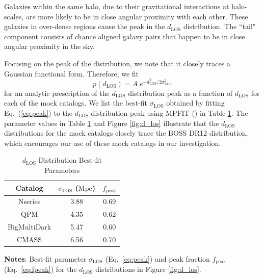 Galaxies within the same halo, due to their gravitational interactions at halo-scales, 
are more likely to be in close angular proximity with each other. These galaxies in 
over-dense regions cause the peak in the $d_{\mathrm{LOS}}$ distribution. The ``tail" 
component consists of chance aligned galaxy pairs that happen to be in close angular 
proximity in the sky. 

Focusing on the peak of the distribution, we note that it closely traces 
a Gaussian functional form. Therefore, we fit
\begin{equation} \label{eq:peak} 
p(d_{\mathrm{LOS}}) = A \; e^{-{d_{\mathrm{LOS}}^2}/{2\sigma_\mathrm{LOS}^2}}
\end{equation}
for an analytic prescription of the $d_{\mathrm{LOS}}$ distribution peak as a 
function of $d_\mathrm{LOS}$ for each of the mock catalogs. We list the 
best-fit $\sigma_\mathrm{LOS}$ obtained by fitting Eq.~(\ref{eq:peak}) to the 
$d_{\mathrm{LOS}}$ distribution peak using 
MPFIT (\citealt{Markwardt:2009aa}) in Table \ref{tab:mpfit}. The parameter values
in Table \ref{tab:mpfit} and Figure \ref{fig:d_los} illustrate that the 
$d_{\mathrm{LOS}}$ distributions for the mock catalogs closely trace 
the BOSS DR12 distribution, which encourages our use of these mock 
catalogs in our investigation.  
\begin{table} 
\caption{$d_{\mathrm{LOS}}$ Distribution Best-fit Parameters} \label{tab:mpfit}
\begin{spacing}{1.5}
\begin{center}
\leavevmode
\begin{tabular}{ccc} \hline \hline
Catalog &$\sigma_\mathrm{LOS}$ ($\mathrm{Mpc}$) & $f_{\mathrm{peak}}$\\ \hline
Nseries&3.88&0.69\\
QPM&4.35&0.62\\
BigMultiDark&5.47&0.60\\ 
CMASS&6.56&0.70\\ \hline
\end{tabular} \par
\end{center}
\end{spacing}
{\bf Notes}: Best-fit parameter $\sigma_\mathrm{LOS}$ (Eq.~\ref{eq:peak}) and peak fraction $f_{\mathrm{peak}}$ (Eq.~\ref{eq:fpeak}) for the $d_{\mathrm{LOS}}$ distributions in Figure \ref{fig:d_los}. 
\smallskip
\end{table}
